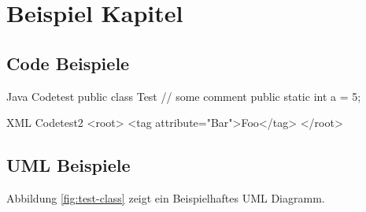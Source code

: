 \chapter{Beispiel Kapitel}

\lipsum
\cite{internet}

\section{Code Beispiele}

\begin{java}{Java Code}{test}
public class Test {
	// some comment
	public static int a = 5;
}
\end{java}

\begin{xml}{XML Code}{test2}
<root>
	<tag attribute="Bar">Foo</tag>
</root>
\end{xml}

\section{UML Beispiele}


Abbildung \ref{fig:test-class} zeigt ein Beispielhaftes UML Diagramm.
